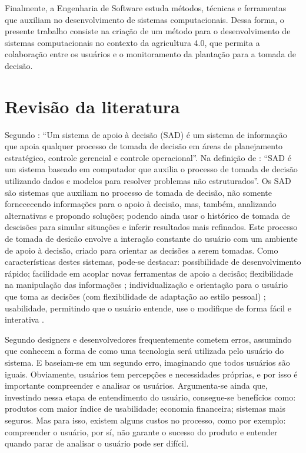 \documentclass[12pt]{article}
\begin{document}
Finalmente, a Engenharia de Software estuda métodos, técnicas e ferramentas que auxiliam no desenvolvimento de sistemas computacionais. Dessa forma, o presente trabalho consiste na criação de um método para o desenvolvimento de sistemas computacionais no contexto da agricultura 4.0, que permita a colaboração entre os usuários e o monitoramento da plantação para a tomada de decisão.

\section{Revisão da literatura}
\label{sec:revisao_literatura}

Segundo : ``Um sistema de apoio à decisão (SAD) é um sistema de informação que apoia qualquer processo de tomada de decisão em áreas de planejamento estratégico, controle gerencial e controle operacional''. Na definição de : ``SAD é um sistema baseado em computador que auxilia o processo de tomada de decisão utilizando dados e modelos para resolver problemas não estruturados''. Os SAD são sistemas que auxiliam no processo de tomada de decisão, não somente fornececendo informações para o apoio à decisão, mas, também, analizando alternativas e propondo soluções; podendo ainda usar o histórico de tomada de descisões para simular situações e inferir resultados mais refinados. Este processo de tomada de desicão envolve a interação constante do usuário com um ambiente de apoio à decisão, criado para orientar as decisões a serem tomadas. Como características destes sistemas, pode-se destacar: possibilidade de desenvolvimento rápido; facilidade em acoplar novas ferramentas de apoio a decisão; flexibilidade na manipulação das informações \cite{John:1989}; individualização e orientação para o usuário que toma as decisões (com flexibilidade de adaptação ao estilo pessoal) \cite{Mittra:1986}; usabilidade, permitindo que o usuário entende, use o modifique de forma fácil e interativa \cite{Awad:1988}.

Segundo  designers e desenvolvedores frequentemente cometem erros, assumindo que conhecem a forma de como uma tecnologia será utilizada pelo usuário do sistema. E baseiam-se em um segundo erro, imaginando que todos usuários são iguais. Obviamente, usuários tem percepções e necessidades próprias, e por isso é importante compreender e analisar os usuários. Argumenta-se ainda que, investindo nessa etapa de entendimento do usuário, consegue-se benefícios como: produtos com maior índice de usabilidade; economia financeira; sistemas mais seguros. Mas para isso, existem alguns custos no processo, como por exemplo: compreender o usuário, por sí, não garante o sucesso do produto e entender quando parar de analisar o usuário pode ser difícil.
\end{document}
